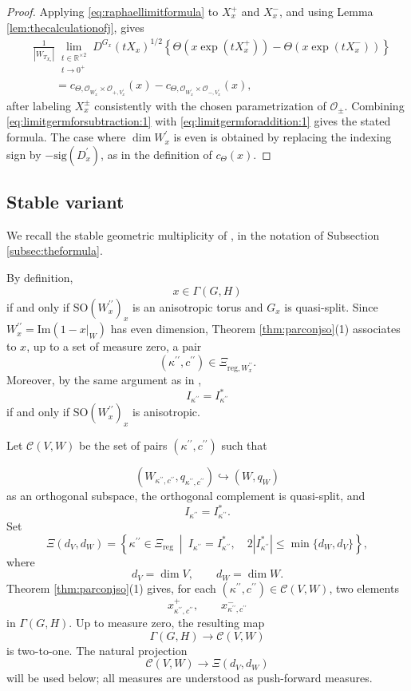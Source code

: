 \documentclass[12pt]{amsart}
\numberwithin{equation}{subsection}
\newcommand{\BR}{{\mathbb {R}}}
\newcommand{\CC}{{\mathcal {C}}}
\newcommand{\CO}{{\mathcal {O}}}
\renewcommand{\Im}{{\mathrm{Im}}}
\newcommand{\reg}{{\mathrm{reg}}}
\newcommand{\SO}{{\mathrm{SO}}}
\def\Gam{{\Gamma}}
\def\p{\prime}
\def\SO{\mathrm{SO}}
\begin{document}
\begin{proof}
Applying \eqref{eq:raphaellimitformula} to $X_x^+$ and $X_x^-$, and using
Lemma \ref{lem:thecalculationofj}, gives
\begin{align}\label{eq:limitgermforsubtraction:1}
&\frac{1}{|W_{T_{X_x}}|}
\lim_{\substack{t\in \BR^{\times 2}\\ t\to 0^+}}
D^{G_x}(tX_x)^{1/2}
\left\{
\Theta(x\exp(tX_x^+))
-
\Theta(x\exp(tX_x^-))
\right\}
\nonumber\\
&\qquad =
c_{\Theta,\CO_{W^\p_x}\times \CO_{+,V^\p_x}}(x)
-
c_{\Theta,\CO_{W^\p_x}\times \CO_{-,V^\p_x}}(x),
\end{align}
after labeling $X_x^\pm$ consistently with the chosen parametrization of
$\CO_\pm$. Combining \eqref{eq:limitgermforsubtraction:1} with
\eqref{eq:limitgermforaddition:1} gives the stated formula. The case where
$\dim W^\p_x$ is even is obtained by replacing the indexing sign by
$-\mathrm{sig}(D^\p_x)$, as in the definition of $c_\Theta(x)$.
\end{proof}

\subsection{Stable variant}\label{subsec:stablevariant}

We recall the stable geometric multiplicity of \cite[\S 3.2]{MR3155345}, in
the notation of Subsection \ref{subsec:theformula}.

By definition,
\[
x\in \Gam(G,H)
\]
if and only if $\SO(W^{\p\p}_x)_x$ is an anisotropic torus and $G_x$ is
quasi-split. Since $W^{\p\p}_x=\Im(1-x|_W)$ has even dimension, Theorem
\ref{thm:parconjso}(1) associates to $x$, up to a set of measure zero, a pair
\[
(\kappa^{\p\p},c^{\p\p})\in \Xi_{\reg,W^{\p\p}_x}.
\]
Moreover, by the same argument as in \cite[Lem.~5.1.0.4]{thesis_zhilin},
\[
I_{\kappa^{\p\p}}=I^*_{\kappa^{\p\p}}
\]
if and only if $\SO(W^{\p\p}_x)_x$ is anisotropic.

Let $\CC(V,W)$ be the set of pairs $(\kappa^{\p\p},c^{\p\p})$ such that

\[
(W_{\kappa^{\p\p},c^{\p\p}},q_{\kappa^{\p\p},c^{\p\p}})
\hookrightarrow (W,q_W)
\]
as an orthogonal subspace, the orthogonal complement is quasi-split, and
\[
I_{\kappa^{\p\p}}=I^*_{\kappa^{\p\p}}.
\]
Set
\[
\Xi(d_V,d_W)
=
\left\{
\kappa^{\p\p}\in \Xi_\reg
\ \middle|\
I_{\kappa^{\p\p}}=I^*_{\kappa^{\p\p}},
\quad
2|I^*_{\kappa^{\p\p}}|\leq \min\{d_W,d_V\}
\right\},
\]
where
\[
d_V=\dim V,\qquad d_W=\dim W.
\]
Theorem \ref{thm:parconjso}(1) gives, for each
$(\kappa^{\p\p},c^{\p\p})\in \CC(V,W)$, two elements
\[
x^+_{\kappa^{\p\p},c^{\p\p}},
\qquad
x^-_{\kappa^{\p\p},c^{\p\p}}
\]
in $\Gam(G,H)$. Up to measure zero, the resulting map
\[
\Gam(G,H)\longrightarrow \CC(V,W)
\]
is two-to-one. The natural projection
\[
\CC(V,W)\longrightarrow \Xi(d_V,d_W)
\]
will be used below; all measures are understood as push-forward measures.
\end{document}
